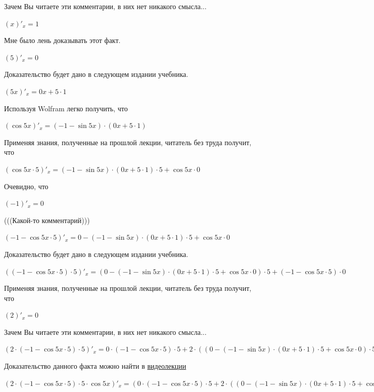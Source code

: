 \documentclass[12pt,a4paper,fleqn]{article}
\theoremstyle{definition}
\begin{document}
Зачем Вы читаете эти комментарии, в них нет никакого смысла... 

$( x )'_{x} =  1 $

Мне было лень доказывать этот факт.

$( 5 )'_{x} =  0 $

Доказательство будет дано в следующем издании учебника. 

$( 5  x )'_{x} =  0  x  +  5  \cdot  1 $

Используя Wolfram легко получить, что 

$(\cos 5  x )'_{x} = ( -1  - \sin 5  x ) \cdot ( 0  x  +  5  \cdot  1 )$

Применяя знания, полученные на прошлой лекции, читатель без труда получит, что 

$(\cos 5  x  \cdot  5 )'_{x} = ( -1  - \sin 5  x ) \cdot ( 0  x  +  5  \cdot  1 ) \cdot  5  + \cos 5  x  \cdot  0 $

Очевидно, что 

$( -1 )'_{x} =  0 $

(((Какой-то комментарий))) 

$( -1  - \cos 5  x  \cdot  5 )'_{x} =  0  - ( -1  - \sin 5  x ) \cdot ( 0  x  +  5  \cdot  1 ) \cdot  5  + \cos 5  x  \cdot  0 $

Доказательство будет дано в следующем издании учебника. 

$(( -1  - \cos 5  x  \cdot  5 ) \cdot  5 )'_{x} = ( 0  - ( -1  - \sin 5  x ) \cdot ( 0  x  +  5  \cdot  1 ) \cdot  5  + \cos 5  x  \cdot  0 ) \cdot  5  + ( -1  - \cos 5  x  \cdot  5 ) \cdot  0 $

Применяя знания, полученные на прошлой лекции, читатель без труда получит, что 

$( 2 )'_{x} =  0 $

Зачем Вы читаете эти комментарии, в них нет никакого смысла... 

$( 2  \cdot ( -1  - \cos 5  x  \cdot  5 ) \cdot  5 )'_{x} =  0  \cdot ( -1  - \cos 5  x  \cdot  5 ) \cdot  5  +  2  \cdot (( 0  - ( -1  - \sin 5  x ) \cdot ( 0  x  +  5  \cdot  1 ) \cdot  5  + \cos 5  x  \cdot  0 ) \cdot  5  + ( -1  - \cos 5  x  \cdot  5 ) \cdot  0 )$

Доказательство данного факта можно найти в \href{https://www.youtube.com/watch?v=dQw4w9WgXcQ}{видеолекции} 

$( 2  \cdot ( -1  - \cos 5  x  \cdot  5 ) \cdot  5  \cdot \cos 5  x )'_{x} = ( 0  \cdot ( -1  - \cos 5  x  \cdot  5 ) \cdot  5  +  2  \cdot (( 0  - ( -1  - \sin 5  x ) \cdot ( 0  x  +  5  \cdot  1 ) \cdot  5  + \cos 5  x  \cdot  0 ) \cdot  5  + ( -1  - \cos 5  x  \cdot  5 ) \cdot  0 )) \cdot \cos 5  x  +  2  \cdot ( -1  - \cos 5  x  \cdot  5 ) \cdot  5  \cdot ( -1  - \sin 5  x ) \cdot ( 0  x  +  5  \cdot  1 )$
\end{document}
